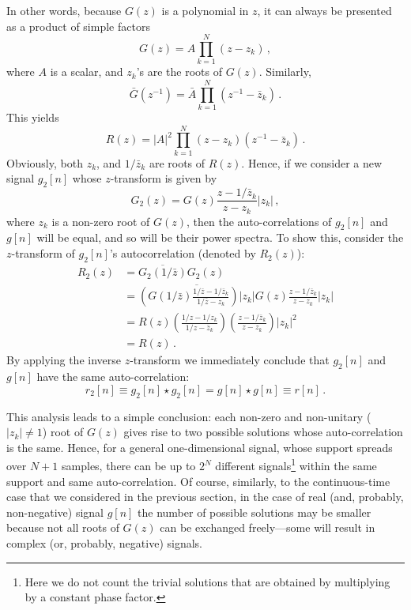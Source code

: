 In other words, because
$G(z)$ is a polynomial in $z$, it can always be presented as a product
of simple factors
\begin{equation}
  \label{eq:116}
  G(z) = A\prod_{k=1}^{N}(z-z_{k}) \,, 
\end{equation}
where $A$ is a scalar, and $z_{k}$'s are the roots of
$G(z)$. Similarly, 
\begin{equation}
  \label{eq:119}
  \bar G(z^{-1}) = \bar A \prod_{k=1}^{N}
  \left(
    z^{-1}-\bar z_{k}
  \right) \,.
\end{equation}
This
yields
\begin{equation}
  \label{eq:117}
  R(z) = |A|^{2}\prod_{k=1}^{N}(z-z_{k})
  \left(
    z^{-1} - \bar z_{k}
  \right) \,. 
\end{equation}
Obviously, both $z_{k}$, and $1/\bar z_{k}$ are roots of $R(z)$.
Hence, if we consider a
new signal $g_{2}[n]$ whose $z$-transform is given by
\begin{equation}
  \label{eq:115}
  G_{2}(z)= G(z)\frac{z - 1/\bar {z}_{k}}{z - z_{k}} |z_{k}| \,, 
\end{equation}
where $z_{k}$ is a non-zero root of $G(z)$,
then the auto-correlations of $g_{2}[n]$ and $g[n]$ will be
equal, and so will be their power spectra. To show this, consider the
$z$-transform of $g_{2}[n]$'s autocorrelation (denoted by $R_{2}(z)$):
\begin{equation}
  \label{eq:120}
  \begin{split}
    R_{2}(z)
    & =  \overline{G_{2}(1/\bar z)}G_{2}(z)\\
    & =  \overline{
      \left(
        G(1/\bar z)\frac{1/\bar z - 1/\bar z_{k}}{1/\bar
          z - z_{k}}
      \right)|z_{k}|}
    G(z)\frac{z - 1/\bar {z}_{k}}{z - z_{k}}|z_{k}|\\
    & = R(z)
    \left(
      \frac{1/ z - 1/z_{k}} {1/z - \bar z_{k}}
    \right)
    \left(
      \frac{z - 1/\bar {z}_{k}}{z - z_{k}}
    \right)|z_{k}|^{2}\\
    & = R(z) \,. 
  \end{split}
\end{equation}
By applying the inverse $z$-transform we immediately conclude that
$g_{2}[n]$ and $g[n]$ have the same auto-correlation:
\begin{equation}
  \label{eq:121}
  r_{2}[n]\equiv g_{2}[n]\star g_{2}[n]= g[n]\star g[n]\equiv r[n]
  \,. 
\end{equation}

This analysis leads to a simple conclusion: each non-zero and
non-unitary ($|z_{k}|\not = 1$) root of $G(z)$ gives rise to two
possible solutions whose auto-correlation is the same. Hence, for a
general one-dimensional signal, whose support spreads over $N+1$
samples, there can be up to $2^{N}$ different signals\footnote{Here we
  do not count the trivial solutions that are obtained by multiplying
  by a constant phase factor.}  within the same support and same
auto-correlation. Of course, similarly, to the continuous-time case
that we considered in the previous section, in the case of real (and,
probably, non-negative) signal $g[n]$ the number of possible solutions
may be smaller because not all roots of $G(z)$ can be exchanged
freely---some will result in complex (or, probably, negative) signals.

